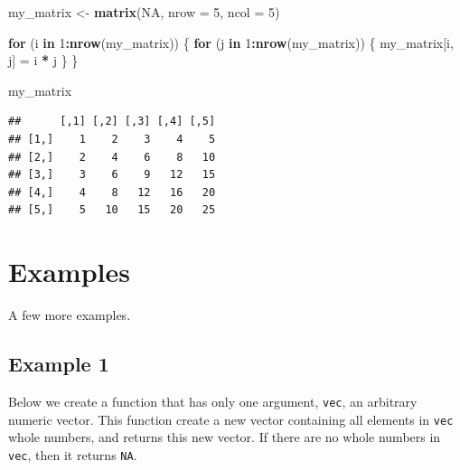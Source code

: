 \documentclass[
]{book}
\newenvironment{Shaded}{\begin{snugshade}}{\end{snugshade}}
\newcommand{\ControlFlowTok}[1]{\textcolor[rgb]{0.13,0.29,0.53}{\textbf{#1}}}
\newcommand{\DataTypeTok}[1]{\textcolor[rgb]{0.13,0.29,0.53}{#1}}
\newcommand{\DecValTok}[1]{\textcolor[rgb]{0.00,0.00,0.81}{#1}}
\newcommand{\KeywordTok}[1]{\textcolor[rgb]{0.13,0.29,0.53}{\textbf{#1}}}
\newcommand{\NormalTok}[1]{#1}
\newcommand{\OperatorTok}[1]{\textcolor[rgb]{0.81,0.36,0.00}{\textbf{#1}}}
\newcommand{\OtherTok}[1]{\textcolor[rgb]{0.56,0.35,0.01}{#1}}
\newcommand{\StringTok}[1]{\textcolor[rgb]{0.31,0.60,0.02}{#1}}
\begin{document}
\begin{Shaded}
\begin{Highlighting}[]
\NormalTok{my_matrix <-}\StringTok{ }\KeywordTok{matrix}\NormalTok{(}\OtherTok{NA}\NormalTok{, }\DataTypeTok{nrow =} \DecValTok{5}\NormalTok{, }\DataTypeTok{ncol =} \DecValTok{5}\NormalTok{)}

\ControlFlowTok{for}\NormalTok{ (i }\ControlFlowTok{in} \DecValTok{1}\OperatorTok{:}\KeywordTok{nrow}\NormalTok{(my_matrix)) \{}
    \ControlFlowTok{for}\NormalTok{ (j }\ControlFlowTok{in} \DecValTok{1}\OperatorTok{:}\KeywordTok{nrow}\NormalTok{(my_matrix)) \{}
\NormalTok{        my_matrix[i, j] =}\StringTok{ }\NormalTok{i }\OperatorTok{*}\StringTok{ }\NormalTok{j}
\NormalTok{    \}}
\NormalTok{\}}

\NormalTok{my_matrix}
\end{Highlighting}
\end{Shaded}

\begin{verbatim}
##      [,1] [,2] [,3] [,4] [,5]
## [1,]    1    2    3    4    5
## [2,]    2    4    6    8   10
## [3,]    3    6    9   12   15
## [4,]    4    8   12   16   20
## [5,]    5   10   15   20   25
\end{verbatim}

\hypertarget{examples-1}{%
\section{Examples}\label{examples-1}}

A few more examples.

\hypertarget{example-1}{%
\subsection{Example 1}\label{example-1}}

Below we create a function that has only one argument, \texttt{vec}, an arbitrary numeric vector. This function create a new vector containing all elements in \texttt{vec} whole numbers, and returns this new vector. If there are no whole numbers in \texttt{vec}, then it returns \texttt{NA}.
\end{document}
